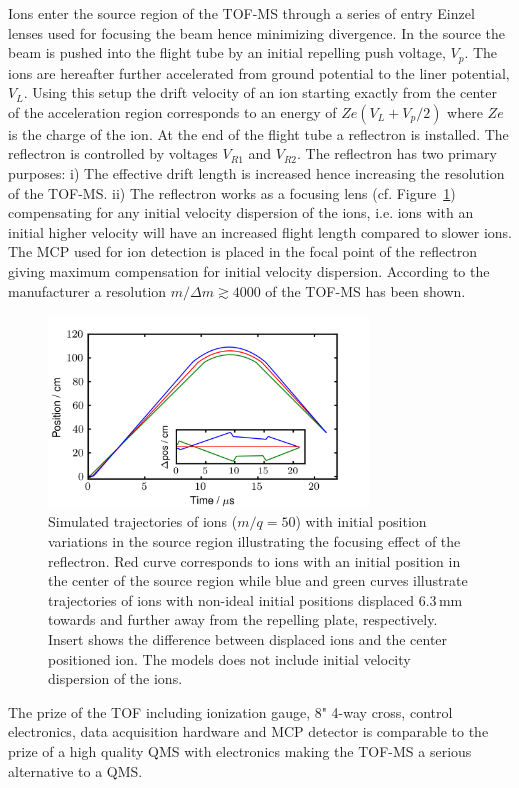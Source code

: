 \documentclass[aip,rsi]{revtex4-1}
\begin{document}
Ions enter the source region of the TOF-MS through a series of entry Einzel lenses used for focusing the beam hence minimizing divergence. In the source the beam is pushed into the flight tube by an initial repelling push voltage, $V_p$. The ions are hereafter further accelerated from ground potential to the liner potential, $V_L$. Using this setup the drift velocity of an ion starting exactly from the center of the acceleration region corresponds to an energy of $Ze\left(V_L + V_p/2\right)$ where $Ze$ is the charge of the ion. At the end of the flight tube a reflectron is installed. The reflectron is controlled by voltages $V_{R1}$ and $V_{R2}$. The reflectron has two primary purposes: i) The effective drift length is increased hence increasing the resolution of the TOF-MS. ii) The reflectron works as a focusing lens (cf. Figure~\ref{fig:trajectory}) compensating for any initial velocity dispersion of the ions, i.e. ions with an initial higher velocity will have an increased flight length compared to slower ions. The MCP used for ion detection is placed in the focal point of the reflectron giving maximum compensation for initial velocity dispersion. According to the manufacturer a resolution $m/\Delta m\gtrsim4000$ of the TOF-MS has been shown.
\begin{figure}
 \includegraphics[width=8.5cm]{trajectory.png}%
 \caption{Simulated trajectories of ions ($m/q=50$) with initial position variations in the source region illustrating the focusing effect of the reflectron. Red curve corresponds to ions with an initial position in the center of the source region while blue and green curves illustrate trajectories of ions with non-ideal initial positions displaced 6.3\,mm towards and further away from the repelling plate, respectively. Insert shows the difference between displaced ions and the center positioned ion. The models does not include initial velocity dispersion of the ions.\label{fig:trajectory}}%
\end{figure}

The prize of the TOF including ionization gauge, 8" 4-way cross, control electronics, data acquisition hardware and MCP detector is comparable to the prize of a high quality QMS with electronics making the TOF-MS a serious alternative to a QMS.
\end{document}
